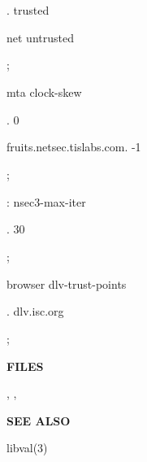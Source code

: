 \begin{description}
\begin{description}

\item . trusted \verb" "

\item net untrusted\verb" "

\item ;\verb" "

\end{description}

\item mta clock-skew \verb" "

\begin{description}

\item . 0 \verb" "

\item fruits.netsec.tislabs.com. -1\verb" "

\item ;\verb" "

\end{description}

\item : nsec3-max-iter \verb" "

\begin{description}

\item . 30\verb" "

\item ;\verb" "

\end{description}

\item browser dlv-trust-points \verb" "

\begin{description}

\item . dlv.isc.org\verb" "

\item ;\verb" "

\end{description}

\end{description}

{\bf FILES}

,
,

{\bf SEE ALSO}

libval(3)

